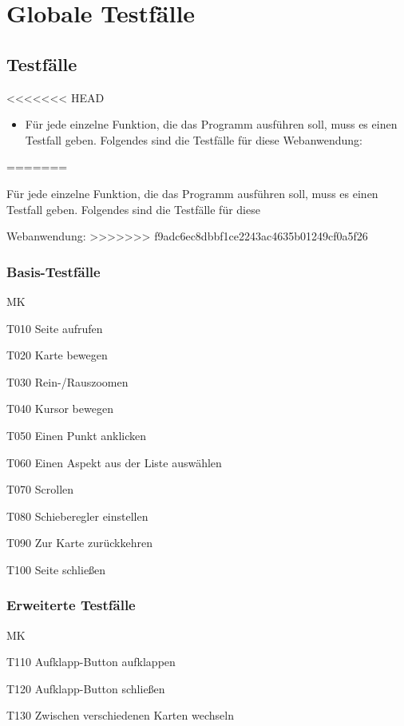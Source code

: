\section{Globale Testfälle}
\subsection{Testfälle}
\setcounter{counter}{10}
<<<<<<< HEAD
\begin{itemize}
	\item Für jede einzelne Funktion, die das Programm ausführen soll, muss es einen Testfall geben. Folgendes sind die Testfälle für diese Webanwendung:
\end{itemize}
=======

Für jede einzelne Funktion, die das Programm ausführen soll, muss es einen Testfall geben. Folgendes sind die Testfälle für diese 

Webanwendung:
>>>>>>> f9adc6ec8dbbf1ce2243ac4635b01249cf0a5f26
\subsubsection{Basis-Testfälle}
\begin{Kriterien}{MK}

	\item[T010] Seite aufrufen

	\item[T020] Karte bewegen
	
	
	\item[T030] Rein-/Rauszoomen
	
	\item[T040] Kursor bewegen
	
	\item[T050] Einen Punkt anklicken
	
	\item[T060] Einen Aspekt aus der Liste auswählen
	
	\item[T070] Scrollen
	
	\item[T080] Schieberegler einstellen
	
	\item[T090] Zur Karte zurückkehren
	
	\item[T100] Seite schließen
\end{Kriterien}
\subsubsection{Erweiterte Testfälle}
\begin{Kriterien}{MK}

	\item[T110] Aufklapp-Button aufklappen

	\item[T120]  Aufklapp-Button schließen
	
	\item[T130] Zwischen verschiedenen Karten wechseln
	
\end{Kriterien}
